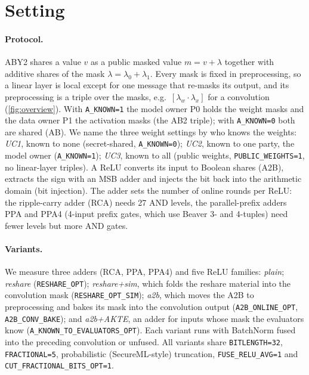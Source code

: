 \documentclass[10pt,a4paper]{article}
\newcommand{\flag}[1]{\nolinkurl{#1}}
\begin{document}
\section{Setting}\label{sec:setting}

\paragraph{Protocol.} ABY2 shares a value $v$ as a public masked value $m = v + \lambda$ together with
additive shares of the mask $\lambda = \lambda_0 + \lambda_1$. Every mask is fixed in preprocessing, so a
linear layer is local except for one message that re-masks its output, and its preprocessing is a triple
over the masks, e.g.\ $[\lambda_w \cdot \lambda_x]$ for a convolution (\cref{fig:overview}). With
\flag{A_KNOWN=1} the model owner P0 holds the weight masks and the data owner P1 the activation masks
(the AB2 triple); with \flag{A_KNOWN=0} both are shared (AB). We name the three weight settings by who knows
the weights: \emph{UC1}, known to none (secret-shared, \flag{A_KNOWN=0}); \emph{UC2}, known to one party, the model
owner (\flag{A_KNOWN=1}); \emph{UC3}, known to all (public weights, \flag{PUBLIC_WEIGHTS=1}, no linear-layer
triples). A ReLU converts its input to Boolean
shares (A2B), extracts the sign with an MSB adder and injects the bit back into the arithmetic domain
(bit injection). The adder sets the number of online rounds per ReLU: the ripple-carry adder
(RCA) needs 27 AND levels, the parallel-prefix adders PPA and PPA4 (4-input prefix gates, which use
Beaver 3- and 4-tuples) need fewer levels but more AND gates.

\paragraph{Variants.} We measure three adders (RCA, PPA, PPA4) and five ReLU families: \emph{plain};
\emph{reshare} (\flag{RESHARE_OPT}); \emph{reshare+sim}, which folds the reshare material into the
convolution mask (\flag{RESHARE_OPT_SIM}); \emph{a2b}, which moves the A2B to preprocessing and bakes its
mask into the convolution output (\flag{A2B_ONLINE_OPT}, \flag{A2B_CONV_BAKE}); and \emph{a2b+AKTE}, an
adder for inputs whose mask the evaluators know (\flag{A_KNOWN_TO_EVALUATORS_OPT}). Each variant runs with
BatchNorm fused into the preceding convolution or unfused. All variants share \flag{BITLENGTH=32},
\flag{FRACTIONAL=5}, probabilistic (SecureML-style) truncation, \flag{FUSE_RELU_AVG=1} and
\flag{CUT_FRACTIONAL_BITS_OPT=1}.
\end{document}

